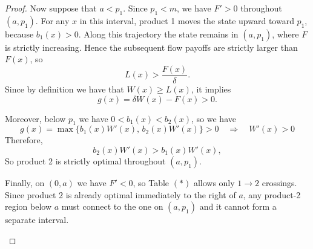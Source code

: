 \documentclass[11pt]{article}
\begin{document}
\begin{proof}
Now suppose that $a<p_1$. Since $p_1<m$, we have $F'>0$ throughout $(a,p_1)$. For any $x$ in this interval, product 1 moves the state upward
toward $p_1$, because $b_1(x)>0$. Along this trajectory the state remains in $(a,p_1)$, where $F$ is strictly increasing. Hence the subsequent flow
payoffs are strictly larger than $F(x)$, so
\begin{equation*}
    L(x)>\frac{F(x)}{\delta}.
\end{equation*}
Since by definition we have that $W(x)\geq L(x)$, it implies 
\begin{equation*}
    g(x)=\delta W(x)-F(x)>0.
\end{equation*}

Moreover, below $p_1$ we have $0<b_1(x)<b_2(x)$, so we have 
\begin{equation*}
    g(x)=\max\{b_1(x)W'(x),\,b_2(x)W'(x)\}>0 \quad \Rightarrow \quad W'(x)>0
\end{equation*}
Therefore,
\begin{equation*}
    b_2(x)W'(x)>b_1(x)W'(x),
\end{equation*}
So product 2 is strictly optimal throughout $(a,p_1)$.

Finally, on $(0,a)$ we have $F'<0$, so Table $(*)$ allows only $1\to2$ crossings. Since product 2 is already optimal immediately to the right of
$a$, any product-2 region below $a$ must connect to the one on $(a,p_1)$ and it cannot form a separate interval.

\begin{figure}[H]
\centering
{}
\end{figure}


\end{proof}
\end{document}
